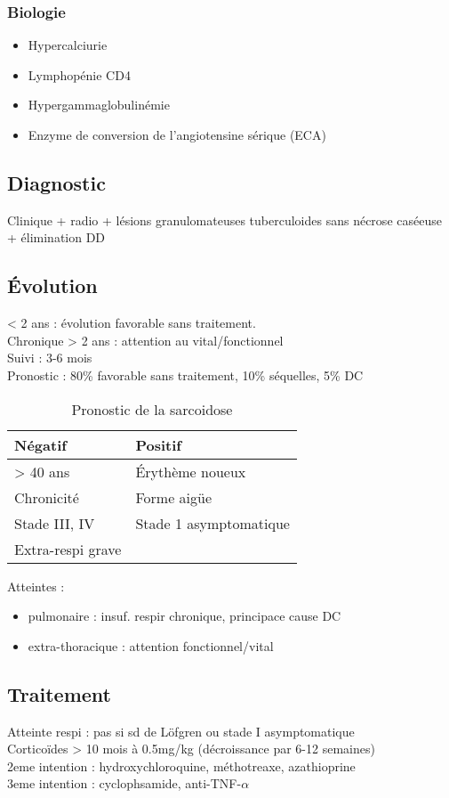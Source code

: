\subsubsection{Biologie}
\label{sec:orgbfe5d87}
\begin{itemize}
\item Hypercalciurie
\item Lymphopénie CD4
\item Hypergammaglobulinémie
\item Enzyme de conversion de l'angiotensine sérique (ECA)
\end{itemize}
\subsection{Diagnostic}
\label{sec:org6670330}
Clinique + radio + lésions granulomateuses tuberculoides sans nécrose caséeuse +
élimination DD
\subsection{Évolution}
\label{sec:org707f9ea}
< 2 ans : évolution favorable sans traitement.\\
Chronique > 2 ans : attention au vital/fonctionnel \\
Suivi : 3-6 mois\\
Pronostic : 80\% favorable sans traitement, 10\% séquelles, 5\% DC

\begin{table}[htbp]
\caption{Pronostic de la sarcoidose}
\centering
\begin{tabular}{ll}
\toprule
Négatif & Positif\\
\midrule
> 40 ans & Érythème noueux\\
Chronicité & Forme aigüe\\
Stade III, IV & Stade 1 asymptomatique\\
Extra-respi grave & \\
\bottomrule
\end{tabular}
\end{table}

Atteintes :
\begin{itemize}
\item pulmonaire : insuf. respir chronique, principace cause DC
\item extra-thoracique : attention fonctionnel/vital
\end{itemize}

\subsection{Traitement}
\label{sec:orgc05b9f6}
Atteinte respi : pas si sd de Löfgren ou stade I asymptomatique\\
Corticoïdes > 10 mois à 0.5mg/kg (décroissance par 6-12 semaines)\\
2eme intention : hydroxychloroquine, méthotreaxe, azathioprine\\
3eme intention : cyclophsamide, anti-TNF-\(\alpha\)

